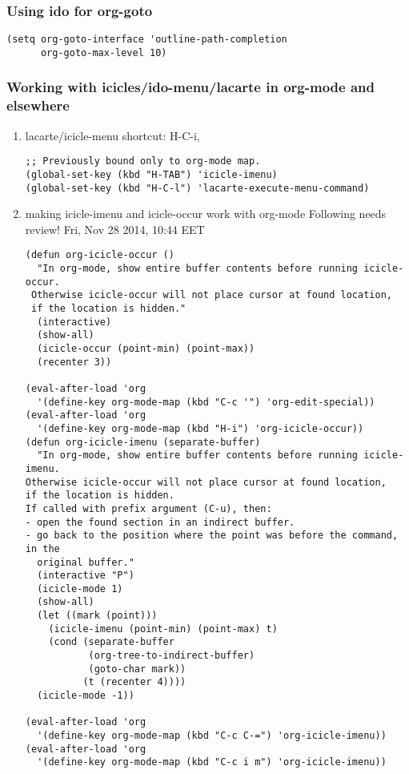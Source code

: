 \documentclass{article}
\begin{document}
\subsubsection{Using ido for org-goto}
\label{sec-2-5-2}

\begin{verbatim}
(setq org-goto-interface 'outline-path-completion
      org-goto-max-level 10)
\end{verbatim}

\subsubsection{Working with icicles/ido-menu/lacarte in org-mode and elsewhere}
\label{sec-2-5-3}
\begin{enumerate}
\item lacarte/icicle-menu shortcut: H-C-i,
\label{sec-2-5-3-1}
\begin{verbatim}
;; Previously bound only to org-mode map.
(global-set-key (kbd "H-TAB") 'icicle-imenu)
(global-set-key (kbd "H-C-l") 'lacarte-execute-menu-command)
\end{verbatim}
\item making icicle-imenu and icicle-occur work with org-mode
\label{sec-2-5-3-2}
Following needs review! Fri, Nov 28 2014, 10:44 EET
\begin{verbatim}
(defun org-icicle-occur ()
  "In org-mode, show entire buffer contents before running icicle-occur.
 Otherwise icicle-occur will not place cursor at found location,
 if the location is hidden."
  (interactive)
  (show-all)
  (icicle-occur (point-min) (point-max))
  (recenter 3))

(eval-after-load 'org
  '(define-key org-mode-map (kbd "C-c '") 'org-edit-special))
(eval-after-load 'org
  '(define-key org-mode-map (kbd "H-i") 'org-icicle-occur))
(defun org-icicle-imenu (separate-buffer)
  "In org-mode, show entire buffer contents before running icicle-imenu.
Otherwise icicle-occur will not place cursor at found location,
if the location is hidden.
If called with prefix argument (C-u), then:
- open the found section in an indirect buffer.
- go back to the position where the point was before the command, in the
  original buffer."
  (interactive "P")
  (icicle-mode 1)
  (show-all)
  (let ((mark (point)))
    (icicle-imenu (point-min) (point-max) t)
    (cond (separate-buffer
           (org-tree-to-indirect-buffer)
           (goto-char mark))
          (t (recenter 4))))
  (icicle-mode -1))

(eval-after-load 'org
  '(define-key org-mode-map (kbd "C-c C-=") 'org-icicle-imenu))
(eval-after-load 'org
  '(define-key org-mode-map (kbd "C-c i m") 'org-icicle-imenu))


\end{verbatim}
\end{enumerate}
\end{document}
